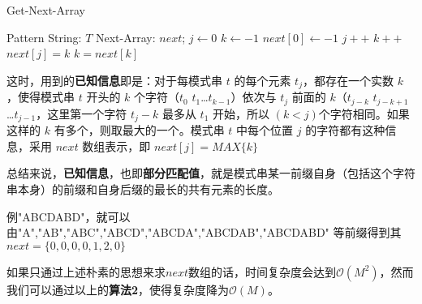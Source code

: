 \documentclass[UTF8]{ctexart}
\begin{document}
\begin{algorithm}
\caption{Get-Next-Array}  
\label{alg:KMP get Next-Array}  
\begin{algorithmic} [1]
    \Require  
	  Pattern String: $T$
    \Ensure  
      Next-Array: $next$;  
		\State $j \gets 0$
		\State $k \gets -1$
		\State $next[0] \gets -1$
				\State $j++$
				\State $k++$
				\State $next[j]=k$
			\Else 
				\State $k=next[k]$
			\EndIf
		 \EndWhile
	\EndFunction  
\end{algorithmic}
\end{algorithm}

这时，用到的\textbf{已知信息}即是：对于每模式串 $t$ 的每个元素 $t_j$，都存在一个实数 $k$ ，使得模式串 $t$ 开头的 $k$ 个字符（$t_0$ $t_1$…$t_{k-1}$）依次与 $t_j$ 前面的 $k$（$t_{j-k}$ $t_{j-k+1}$…$t_{j-1}$，这里第一个字符 $t_j-k$ 最多从 $t_1$ 开始，所以 $(k < j)$个字符相同。如果这样的 $k$ 有多个，则取最大的一个。模式串 $t$ 中每个位置 $j$ 的字符都有这种信息，采用 $next$ 数组表示，即 $next[j]=MAX\{ k \}$


总结来说，\textbf{已知信息}，也即\textbf{部分匹配值}，就是模式串某一前缀自身（包括这个字符串本身）的前缀和自身后缀的最长的共有元素的长度。 \par 

例"ABCDABD"，就可以由"A","AB","ABC","ABCD","\textcolor[rgb]{1,0,0}{A}BCD\textcolor[rgb]{1,0,0}{A}","\textcolor[rgb]{1,0,0}{AB}CD\textcolor[rgb]{1,0,0}{AB}","ABCDABD" 等前缀得到其$next=\{0, 0, 0, 0, 1, 2, 0\}$

如果只通过上述朴素的思想来求$next$数组的话，时间复杂度会达到$\mathcal{O}(M^2)$，然而我们可以通过以上的\textbf{算法2}，使得复杂度降为$\mathcal{O}(M)$。
\end{document}
